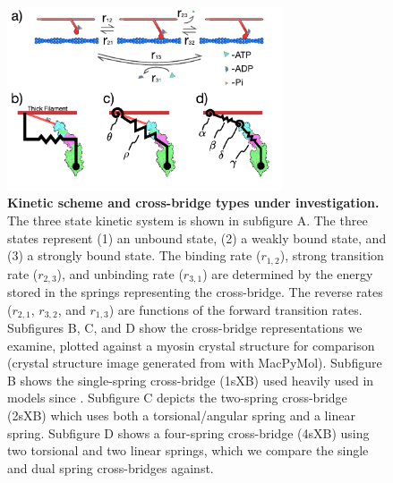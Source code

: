 \documentclass[]{article}
\begin{document}
\begin{figure}[ht]
    \begin{center}
    \includegraphics[width=3.2in]{../imgs/Figure1.pdf}
    \caption{
        \label{fig_xb_types}
        \textbf{Kinetic scheme and cross-bridge types under investigation.} 
        The three state kinetic system is shown in subfigure A. 
        The three states represent (1) an unbound state, (2) a weakly bound state, and (3) a strongly bound state. 
        The binding rate ($r_{1,2}$), strong transition rate ($r_{2,3}$), and unbinding rate ($r_{3,1}$) are determined by the energy stored in the springs representing the cross-bridge. 
        The reverse rates ($r_{2,1}$, $r_{3,2}$, and $r_{1,3}$) are functions of the forward transition rates.
        Subfigures B, C, and D show the cross-bridge representations we examine, plotted against a myosin crystal structure for comparison (crystal structure image generated from \citet{Gourinath2003} with MacPyMol). 
        Subfigure B shows the single-spring cross-bridge (1sXB) used heavily used in models since \protect\citep{Huxley1957}. 
        Subfigure C depicts the two-spring cross-bridge (2sXB) which uses both a torsional/angular spring and a linear spring. 
        Subfigure D shows a four-spring cross-bridge (4sXB) using two torsional and two linear springs, which we compare the single and dual spring cross-bridges against. 
    }
    \end{center}
\end{figure}
\end{document}
